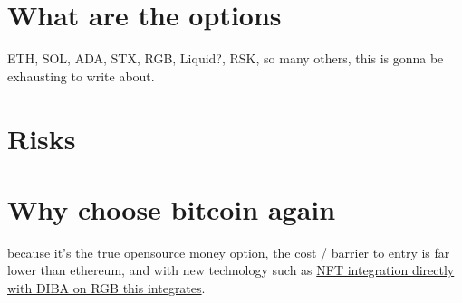 

\section{What are the options }
ETH, SOL, ADA, STX, RGB, Liquid?, RSK, so many others, this is gonna be exhausting to write about.
\section{Risks}
\section{Why choose bitcoin again }
because it's the true opensource money option, the cost / barrier to entry is far lower than ethereum, and with new technology such as \href{https://diba.io}{NFT integration directly with DIBA on RGB this integrates}. 
